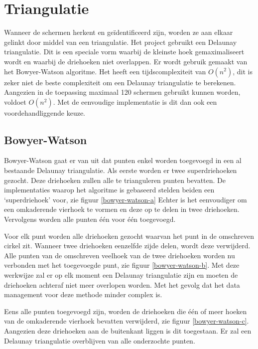 \section{Triangulatie}
Wanneer de schermen herkent en geïdentificeerd zijn, worden ze aan elkaar gelinkt door middel van een triangulatie. Het project gebruikt een Delaunay triangulatie. Dit is een speciale vorm waarbij de kleinste hoek gemaximaliseert wordt en waarbij de driehoeken niet overlappen. \cite{delaunaywiki}
Er wordt gebruik gemaakt van het Bowyer-Watson algoritme. \cite{Bowyer-WatsonWiki} Het heeft een tijdscomplexiteit van $O(n^2)$, dit is zeker niet de beste complexiteit om een Delaunay triangulatie te berekenen. Aangezien in de toepassing maximaal 120 schermen gebruikt kunnen worden, voldoet $O(n^2)$. Met de eenvoudige implementatie is dit dan ook een voordehandliggende keuze.

\subsection{Bowyer-Watson}
Bowyer-Watson gaat er van uit dat punten enkel worden toegevoegd in een al bestaande Delaunay triangulatie. Als eerste worden er twee superdriehoeken gezocht. Deze driehoeken zullen alle te trianguleren punten bevatten. De implementaties waarop het algoritme is gebaseerd \cite{Bowyer-WatsonWiki} \cite{bowyer-watsonImplementation} stelden beiden een `superdriehoek' voor, zie figuur \ref{bowyer-watson-a} Echter is het eenvoudiger om een omkaderende vierhoek te vormen en deze op te delen in twee driehoeken. Vervolgens worden alle punten één voor één toegevoegd.

Voor elk punt worden alle driehoeken gezocht waarvan het punt in de omschreven cirkel zit. Wanneer twee driehoeken eenzelfde zijde delen, wordt deze verwijderd. Alle punten van de omschreven veelhoek van de twee driehoeken worden nu verbonden met het toegevoegde punt, zie figuur \ref{bowyer-watson-b}. Met deze werkwijze zal er op elk moment een Delaunay triangulatie zijn en moeten de driehoeken achteraf niet meer overlopen worden. Met het gevolg dat het data management voor deze methode minder complex is.

Eens alle punten toegevoegd zijn, worden de driehoeken die één of meer hoeken van de omkaderende vierhoek bevatten verwijderd, zie figuur \ref{bowyer-watson-c}. Aangezien deze driehoeken aan de buitenkant liggen is dit toegestaan. Er zal een Delaunay triangulatie overblijven van alle onderzochte punten.


